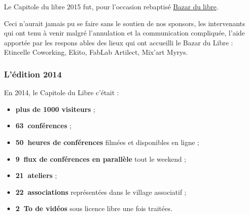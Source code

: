 Le Capitole du libre 2015 fut, pour l'occasion rebaptisé \href{http://bazardulibre.org}{Bazar du libre}.

Ceci n'aurait jamais pu se faire sans le soutien de nos sponsors, les intervenants qui ont tenu à venir malgré l'annulation et la communication compliquée, l'aide apportée par les respons    ables des lieux qui ont accueilli le Bazar du Libre : Etincelle Coworking, Ekito, FabLab Artilect, Mix’art Myrys.

\subsubsection{L'édition 2014}

\begin{minipage}{0.6\textwidth}
En 2014, le Capitole du Libre c'était :
\begin{itemize}[label=$\bullet$]
\item \textbf{plus de \num{1000} visiteurs} ;
\item \textbf{63~conférences} ;
\item \textbf{50~heures de conférences} filmées et disponibles en ligne ;
\item \textbf{9~flux de conférences en parallèle} tout le weekend ;
\item \textbf{21~ateliers} ;
\item \textbf{22~associations} représentées dans le village associatif ;
\item \textbf{\SI{2}{\tera o} de vidéos} sous licence libre une fois traitées.
\end{itemize}
\end{minipage}
\begin{minipage}{0.4\textwidth}
\begin{center}
\end{center}
\end{minipage}


